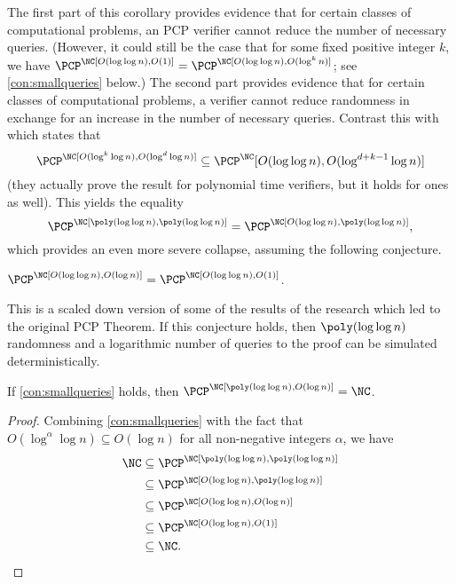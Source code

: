 \documentclass{article}
\newcommand{\loglog}{\log \log}
\begin{document}
The first part of this corollary provides evidence that for certain classes of computational problems, an \NC{} PCP verifier cannot reduce the number of necessary queries.
(However, it could still be the case that for some fixed positive integer $k$, we have $\PCP^\NC[O(\loglog n), O(1)] = \PCP^\NC[O(\loglog n), O(\log^k n)]$; see \autoref{con:smallqueries} below.)
The second part provides evidence that for certain classes of computational problems, a verifier cannot reduce randomness in exchange for an increase in the number of necessary queries.
Contrast this with \cite[Corollary~10]{fs96} which states that
\begin{equation*}
  \PCP^\NC[O(\log^k \log n), O(\log^d \log n)] \subseteq \PCP^\NC[O(\loglog n), O(\log^{d + k - 1} \log n)]
\end{equation*}
(they actually prove the result for polynomial time verifiers, but it holds for \NC{} ones as well).
This yields the equality
\begin{equation*}
  \PCP^\NC[\poly(\loglog n), \poly(\loglog n)] = \PCP^\NC[O(\loglog n), \poly(\loglog n)],
\end{equation*}
which provides an even more severe collapse, assuming the following conjecture.
\begin{conjecture}\label{con:smallqueries}
  $\PCP^\NC[O(\loglog n), O(\log n)] = \PCP^\NC[O(\loglog n), O(1)]$.
\end{conjecture}
This is a scaled down version of some of the results of the research which led to the original PCP Theorem.
If this conjecture holds, then $\poly(\loglog n)$ randomness and a logarithmic number of queries to the proof can be simulated deterministically.
\begin{theorem}
  If \autoref{con:smallqueries} holds, then $\PCP^\NC[\poly(\loglog n), O(\log n)] = \NC$.
\end{theorem}
\begin{proof}
  Combining \autoref{con:smallqueries} with the fact that $O(\log^\alpha \log n) \subseteq O(\log n)$ for all non-negative integers $\alpha$, we have
  \begin{align*}
    \NC & \subseteq \PCP^\NC[\poly(\loglog n), \poly(\loglog n)] \\
    & \subseteq \PCP^\NC[O(\loglog n), \poly(\loglog n)] \\
    & \subseteq \PCP^\NC[O(\loglog n), O(\log n)] \\
    & \subseteq \PCP^\NC[O(\loglog n), O(1)] \\
    & \subseteq \NC.
  \end{align*}
\end{proof}
\end{document}
